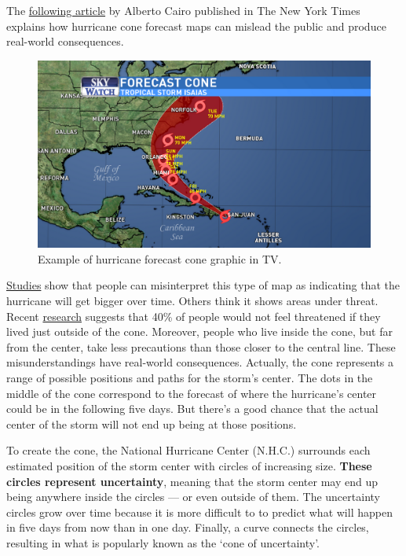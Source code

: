 \documentclass[
]{book}
\begin{document}
The \href{https://www.nytimes.com/interactive/2019/08/29/opinion/hurricane-dorian-forecast-map.html}{following article} by Alberto Cairo published in The New York Times explains how hurricane cone forecast maps can mislead the public and produce real-world consequences.

\begin{figure}

{\centering \includegraphics[width=0.66\linewidth]{Figures/hurricane-forecast-maps-tv} 

}

\caption{Example of hurricane forecast cone graphic in TV.}\label{fig:hurricane-tv}
\end{figure}

\href{https://www.semanticscholar.org/paper/Misinterpretations-of-the-\%E2\%80\%9CCone-of-Uncertainty\%E2\%80\%9D-in-Broad-Leiserowitz/f7c04b6eb883cf7d7fdee007cda056ed18182829}{Studies} show that people can misinterpret this type of map as indicating that the hurricane will get bigger over time. Others think it shows areas under threat. Recent \href{https://interactive.miami.edu/hurakan/}{research} suggests that 40\% of people would not feel threatened if they lived just outside of the cone. Moreover, people who live inside the cone, but far from the center, take less precautions than those closer to the central line. These misunderstandings have real-world consequences. Actually, the cone represents a range of possible positions and paths for the storm's center. The dots in the middle of the cone correspond to the forecast of where the hurricane's center could be in the following five days. But there's a good chance that the actual center of the storm will not end up being at those positions.

To create the cone, the National Hurricane Center (N.H.C.) surrounds each estimated position of the storm center with circles of increasing size. \textbf{These circles represent uncertainty}, meaning that the storm center may end up being anywhere inside the circles --- or even outside of them. The uncertainty circles grow over time because it is more difficult to to predict what will happen in five days from now than in one day. Finally, a curve connects the circles, resulting in what is popularly known as the `cone of uncertainty'.
\end{document}
